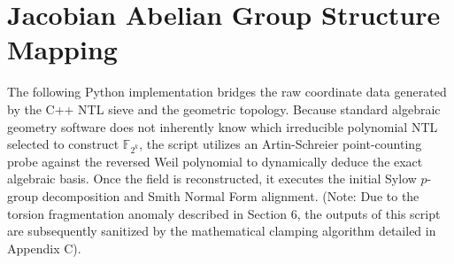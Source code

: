 \documentclass[11pt,letterpaper]{article}
\begin{document}
\section{Jacobian Abelian Group Structure Mapping}
The following Python implementation bridges the raw coordinate data generated by the C++ NTL sieve and the geometric topology. Because standard algebraic geometry software does not inherently know which irreducible polynomial NTL selected to construct $\mathbb{F}_{2^k}$, the script utilizes an Artin-Schreier point-counting probe against the reversed Weil polynomial to dynamically deduce the exact algebraic basis. Once the field is reconstructed, it executes the initial Sylow $p$-group decomposition and Smith Normal Form alignment. (Note: Due to the torsion fragmentation anomaly described in Section 6, the outputs of this script are subsequently sanitized by the mathematical clamping algorithm detailed in Appendix C).
\end{document}
